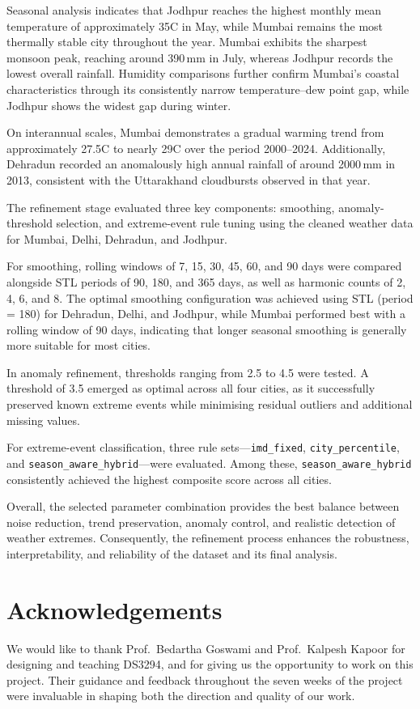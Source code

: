 Seasonal analysis indicates that Jodhpur reaches the highest monthly mean 
temperature of approximately 35\textdegree C in May, while Mumbai remains the most 
thermally stable city throughout the year. Mumbai exhibits the sharpest monsoon 
peak, reaching around 390\,mm in July, whereas Jodhpur records the lowest overall 
rainfall. Humidity comparisons further confirm Mumbai's coastal characteristics 
through its consistently narrow temperature--dew point gap, while Jodhpur shows 
the widest gap during winter. 

On interannual scales, Mumbai demonstrates a gradual warming trend from 
approximately 27.5\textdegree C to nearly 29\textdegree C over the period 
2000--2024. Additionally, Dehradun recorded an anomalously high annual rainfall 
of around 2000\,mm in 2013, consistent with the Uttarakhand cloudbursts 
observed in that year.

The refinement stage evaluated three key components: smoothing, anomaly-threshold 
selection, and extreme-event rule tuning using the cleaned weather data for 
Mumbai, Delhi, Dehradun, and Jodhpur. 

For smoothing, rolling windows of 7, 15, 30, 45, 60, and 90 days were compared 
alongside STL periods of 90, 180, and 365 days, as well as harmonic counts of 
2, 4, 6, and 8. The optimal smoothing configuration was achieved using STL 
(period = 180) for Dehradun, Delhi, and Jodhpur, while Mumbai performed best 
with a rolling window of 90 days, indicating that longer seasonal smoothing is 
generally more suitable for most cities.

In anomaly refinement, thresholds ranging from 2.5 to 4.5 were tested. A threshold 
of 3.5 emerged as optimal across all four cities, as it successfully preserved 
known extreme events while minimising residual outliers and additional missing values.

For extreme-event classification, three rule sets---\texttt{imd\_fixed}, 
\texttt{city\_percentile}, and \texttt{season\_aware\_hybrid}---were evaluated. 
Among these, \texttt{season\_aware\_hybrid} consistently achieved the highest 
composite score across all cities.

Overall, the selected parameter combination provides the best balance between 
noise reduction, trend preservation, anomaly control, and realistic detection 
of weather extremes. Consequently, the refinement process enhances the robustness, 
interpretability, and reliability of the dataset and its final analysis.
\section{Acknowledgements}
We would like to thank Prof.\ Bedartha Goswami and Prof.\ Kalpesh Kapoor 
for designing and teaching DS3294, and for giving us the opportunity to 
work on this project. Their guidance and feedback throughout the seven 
weeks of the project were invaluable in shaping both the direction and 
quality of our work.

